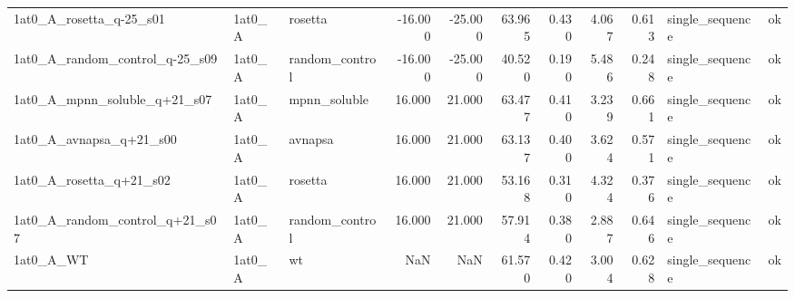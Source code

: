 \begin{table}
\begin{tabular}{lllrrrrrrll}
1at0\_A\_rosetta\_q-25\_s01 & 1at0\_A & rosetta & -16.000 & -25.000 & 63.965 & 0.430 & 4.067 & 0.613 & single\_sequence & ok \\
1at0\_A\_random\_control\_q-25\_s09 & 1at0\_A & random\_control & -16.000 & -25.000 & 40.520 & 0.190 & 5.486 & 0.248 & single\_sequence & ok \\
1at0\_A\_mpnn\_soluble\_q+21\_s07 & 1at0\_A & mpnn\_soluble & 16.000 & 21.000 & 63.477 & 0.410 & 3.239 & 0.661 & single\_sequence & ok \\
1at0\_A\_avnapsa\_q+21\_s00 & 1at0\_A & avnapsa & 16.000 & 21.000 & 63.137 & 0.400 & 3.624 & 0.571 & single\_sequence & ok \\
1at0\_A\_rosetta\_q+21\_s02 & 1at0\_A & rosetta & 16.000 & 21.000 & 53.168 & 0.310 & 4.324 & 0.376 & single\_sequence & ok \\
1at0\_A\_random\_control\_q+21\_s07 & 1at0\_A & random\_control & 16.000 & 21.000 & 57.914 & 0.380 & 2.887 & 0.646 & single\_sequence & ok \\
1at0\_A\_WT & 1at0\_A & wt & NaN & NaN & 61.570 & 0.420 & 3.004 & 0.628 & single\_sequence & ok \\
\bottomrule
\end{tabular}
\end{table}
